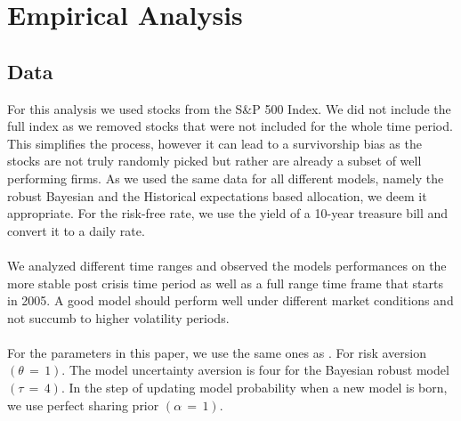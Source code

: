 \section{Empirical Analysis}

\subsection{Data}
For this analysis we used stocks from the S\&P 500 Index. We did not include the full index as we removed stocks that were not included for the whole time period. This simplifies the process, however it can lead to a survivorship bias as the stocks are not truly randomly picked but rather are already a subset of well performing firms. As we used the same data for all different models, namely the robust Bayesian and the Historical expectations based allocation, we deem it appropriate. For the risk-free rate, we use the yield of a 10-year treasure bill and convert it to a daily rate.\\
\\
We analyzed different time ranges and observed the models performances on the more stable post crisis time period as well as a full range time frame that starts in 2005. A good model should perform well under different market conditions and not succumb to higher volatility periods.\\
\\
For the parameters in this paper, we use the same ones as \cite{anderson_cheng_2016}. For risk aversion $(\theta \,=\,1)$.
The model uncertainty aversion is four for the Bayesian robust model $(\tau\,= \,4)$. In the step of updating model probability when a new model is born, we use perfect sharing prior $(\alpha\,=\,1)$.

